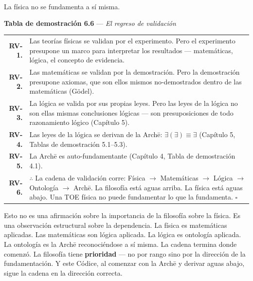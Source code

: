 \documentclass[10pt, openany, oneside]{book}
\renewcommand{\footnotesize}{\fontsize{8.5}{11}\selectfont}
\begin{document}
\vspace{1em}

\noindent La física no se fundamenta a sí misma.

\vspace{0.5em}

\textbf{Tabla de demostración 6.6} --- \textit{El regreso de validación}

\vspace{0.5em}

{\footnotesize
\noindent\begin{tabular}{r p{}}
\textbf{RV-1.} & Las teorías físicas se validan por el experimento. Pero el experimento presupone un marco para interpretar los resultados --- matemáticas, lógica, el concepto de evidencia. \\[0.3em]
\textbf{RV-2.} & Las matemáticas se validan por la demostración. Pero la demostración presupone axiomas, que son ellos mismos no-demostrados dentro de las matemáticas (G\"{o}del). \\[0.3em]
\textbf{RV-3.} & La lógica se valida por sus propias leyes. Pero las leyes de la lógica no son ellas mismas conclusiones lógicas --- son presuposiciones de todo razonamiento lógico (Capítulo 5). \\[0.3em]
\textbf{RV-4.} & Las leyes de la lógica se derivan de la Arch\={e}: $\exists(\exists) \equiv \exists$ (Capítulo 5, Tablas de demostración 5.1--5.3). \\[0.3em]
\textbf{RV-5.} & La Arch\={e} es auto-fundamentante (Capítulo 4, Tabla de demostración 4.1). \\[0.3em]
\textbf{RV-6.} & $\therefore$ La cadena de validación corre: Física $\to$ Matemáticas $\to$ Lógica $\to$ Ontología $\to$ Arch\={e}. La filosofía está aguas arriba. La física está aguas abajo. Una TOE física no puede fundamentar lo que la fundamenta. $\square$ \\[0.3em]
\end{tabular}
}

\vspace{0.8em}

\noindent Esto no es una afirmación sobre la importancia de la filosofía sobre la física. Es una observación estructural sobre la dependencia. La física es matemáticas aplicadas. Las matemáticas son lógica aplicada. La lógica es ontología aplicada. La ontología es la Arch\={e} reconociéndose a sí misma. La cadena termina donde comenzó. La filosofía tiene \textbf{prioridad} --- no por rango sino por la dirección de la fundamentación. Y este Códice, al comenzar con la Arch\={e} y derivar aguas abajo, sigue la cadena en la dirección correcta.
\end{document}
